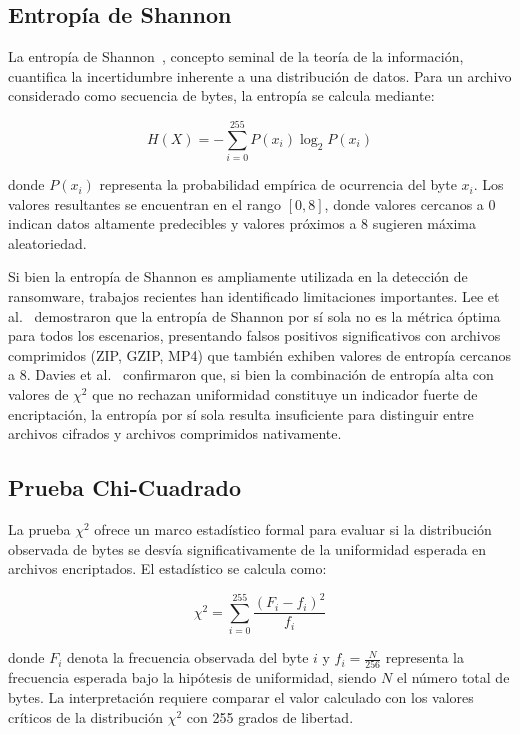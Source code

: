 \subsection{Entropía de Shannon}

La entropía de Shannon~\cite{shannon1948}, concepto seminal de la teoría de la información, cuantifica la incertidumbre inherente a una distribución de datos. Para un archivo considerado como secuencia de bytes, la entropía se calcula mediante:

\begin{equation}
    H(X) = -\sum_{i=0}^{255} P(x_i) \log_2 P(x_i)
\end{equation}

donde $P(x_i)$ representa la probabilidad empírica de ocurrencia del byte $x_i$. Los valores resultantes se encuentran en el rango $[0, 8]$, donde valores cercanos a 0 indican datos altamente predecibles y valores próximos a 8 sugieren máxima aleatoriedad.

Si bien la entropía de Shannon es ampliamente utilizada en la detección de ransomware, trabajos recientes han identificado limitaciones importantes. Lee et al.~\cite{lee2022} demostraron que la entropía de Shannon por sí sola no es la métrica óptima para todos los escenarios, presentando falsos positivos significativos con archivos comprimidos (ZIP, GZIP, MP4) que también exhiben valores de entropía cercanos a 8. Davies et al.~\cite{paper_4_comparison_of_entropy} confirmaron que, si bien la combinación de entropía alta con valores de $\chi^2$ que no rechazan uniformidad constituye un indicador fuerte de encriptación, la entropía por sí sola resulta insuficiente para distinguir entre archivos cifrados y archivos comprimidos nativamente.

\subsection{Prueba Chi-Cuadrado}

La prueba $\chi^2$ ofrece un marco estadístico formal para evaluar si la distribución observada de bytes se desvía significativamente de la uniformidad esperada en archivos encriptados. El estadístico se calcula como:

\begin{equation}
    \chi^2 = \sum_{i=0}^{255} \frac{(F_i - f_i)^2}{f_i}
\end{equation}

donde $F_i$ denota la frecuencia observada del byte $i$ y $f_i = \frac{N}{256}$ representa la frecuencia esperada bajo la hipótesis de uniformidad, siendo $N$ el número total de bytes. La interpretación requiere comparar el valor calculado con los valores críticos de la distribución $\chi^2$ con 255 grados de libertad.

